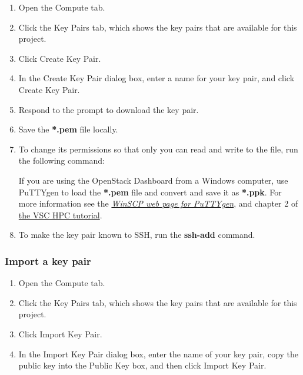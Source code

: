 \begin{enumerate}
\item Open the Compute tab.
\item Click the Key Pairs tab, which shows the key pairs that are
  available for this project.
\item Click Create Key Pair.
\item In the Create Key Pair dialog box, enter a name for your key
  pair, and click Create Key Pair.
\item Respond to the prompt to download the key pair.
\item Save the \textbf{*.pem} file locally.
\item To change its permissions so that only you can read and write to
  the file, run the following command:

  \begin{prompt}
  \end{prompt}

   If you are using the \gls{OpenStack Dashboard} from a
  Windows computer, use PuTTYgen to load the \textbf{*.pem} file and
  convert and save it as \textbf{*.ppk}.  For more information see the
  \href{https://winscp.net/eng/docs/ui_puttygen}{\emph{WinSCP web page
      for PuTTYgen}}, and chapter 2 of
  \href{https://www.vscentrum.be/support/tut-book/vsc-tutorials}{the
    VSC HPC tutorial}.

\item To make the key pair known to SSH, run the \textbf{ssh-add}
  command.

  \begin{prompt}
  \end{prompt}
\end{enumerate}

\subsubsection{Import a key pair}\label{import-a-key-pair}
\begin{enumerate}
\item Open the Compute tab.
\item Click the Key Pairs tab, which shows the key pairs that are
  available for this project.
\item Click Import Key Pair.
\item In the Import Key Pair dialog box, enter the name of your key
  pair, copy the public key into the Public Key box, and then click
  Import Key Pair.
\end{enumerate}

